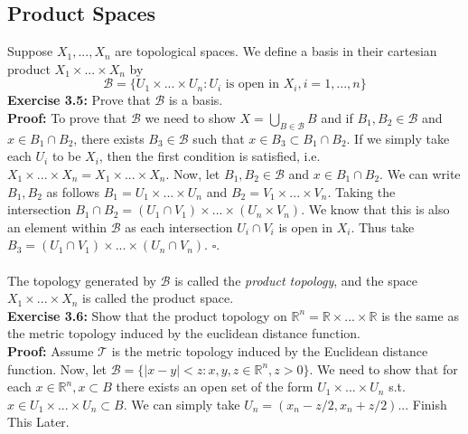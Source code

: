 \documentclass{article}
\begin{document}
  \subsection{Product Spaces}
  Suppose $X_1,...,X_n$ are topological spaces. We define a basis in their cartesian product $X_1\times...\times X_n$ by
  \begin{equation*}
      \mathcal{B}=\{U_1\times...\times U_n:U_i \text{ is open in }X_i,i=1,...,n\}
  \end{equation*}
  \textbf{Exercise 3.5:} Prove that $\mathcal{B}$ is a basis.\\
  \textbf{Proof:} To prove that $\mathcal{B}$ we need to show $X=\bigcup_{B\in\mathcal{B}}B$ and if $B_1,B_2\in\mathcal{B}$ and $x\in B_1\cap B_2$, there exists $B_3\in\mathcal{B}$ such that $x\in B_3\subset B_1\cap B_2$. If we simply take each $U_i$ to be $X_i$, then the first condition is satisfied, i.e. $X_1\times...\times X_n=X_1\times...\times X_n$. Now, let $B_1,B_2\in\mathcal{B}$ and $x\in B_1\cap B_2$. We can write $B_1,B_2$ as follows $B_1=U_1\times...\times U_n$ and $B_2=V_1\times...\times V_n$. Taking the intersection $B_1\cap B_2=(U_1\cap V_1)\times...\times (U_n\times V_n)$. We know that this is also an element within $\mathcal{B}$ as each intersection $U_i\cap V_i$ is open in $X_i$. Thus take $B_3=(U_1\cap V_1)\times...\times (U_n\cap V_n)$. $\square$.\\
  \\
  The topology generated by $\mathcal{B}$ is called the \textit{product topology}, and the space $X_1\times...\times X_n$ is called the product space.\\
  \textbf{Exercise 3.6:} Show that the product topology on $\mathbb{R}^n=\mathbb{R}\times...\times\mathbb{R}$ is the same as the metric topology induced by the euclidean distance function.\\
  \textbf{Proof:} Assume $\mathcal{T}$ is the metric topology induced by the Euclidean distance function. Now, let $\mathcal{B}=\{|x-y|<z:x,y,z\in\mathbb{R}^n,z>0\}$. We need to show that for each $x\in\mathbb{R}^n, x\subset B$ there exists an open set of the form $U_1\times...\times U_n$ s.t. $x\in U_1\times...\times U_n\subset B$. We can simply take $U_n=(x_n-z/2, x_n+z/2)$... Finish This Later.
\end{document}
